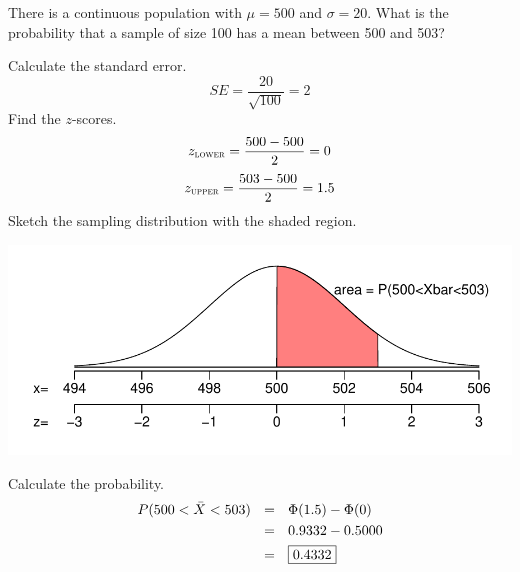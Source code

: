 \documentclass[12pt,letterpaper,addpoints]{exam}
\begin{document}
\begin{questions}
\newpage

\question[10] There is a continuous population with $\mu=500$ and $\sigma=20$. What is the probability that a sample of size 100 has a mean between 500 and 503?
\begin{solution}
Calculate the standard error.
$$SE = \frac{20}{\sqrt{100}} = 2 $$
Find the $z$-scores.
$$z_\textsc{lower} = \frac{500-500}{2} = 0 $$
$$z_\textsc{upper} = \frac{503-500}{2} = 1.5 $$
Sketch the sampling distribution with the shaded region.
\begin{center}
\includegraphics[scale=1]{figures/sketch10.pdf}
\end{center}
Calculate the probability.
\begin{align*}
P(500<\bar{X}<503) ~~&=~~ \Phi(1.5) - \Phi(0) \\
&=~~ 0.9332-0.5000 \\
&=~~ \fbox{0.4332}
\end{align*}

\end{solution}

\end{questions}



\end{document}
